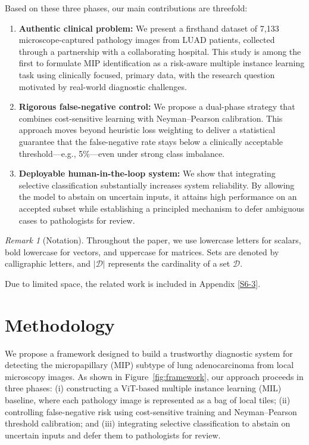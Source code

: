 \documentclass[sigconf,review,anonymous]{acmart}
\theoremstyle{remark}
\newtheorem{remark}[theorem]{Remark}
\begin{document}
Based on these three phases, our main contributions are threefold:
\begin{enumerate}
\item \textbf{Authentic clinical problem:} We present a firsthand dataset of 7,133 microscope-captured pathology images from LUAD patients, collected through a partnership with a collaborating hospital. This study is among the first to formulate MIP identification as a risk-aware multiple instance learning task using clinically focused, primary data, with the research question motivated by real-world diagnostic challenges.
\item \textbf{Rigorous false-negative control:} We propose a dual-phase strategy that combines cost-sensitive learning with Neyman–Pearson calibration. This approach moves beyond heuristic loss weighting to deliver a statistical guarantee that the false-negative rate stays below a clinically acceptable threshold—e.g., 5\%—even under strong class imbalance.
\item \textbf{Deployable human-in-the-loop system:} We show that integrating selective classification substantially increases system reliability. By allowing the model to abstain on uncertain inputs, it attains high performance on an accepted subset while establishing a principled mechanism to defer ambiguous cases to pathologists for review.
\end{enumerate}
\begin{remark}[Notation]
Throughout the paper, we use lowercase letters for scalars, bold lowercase for vectors, and uppercase for matrices. Sets are denoted by calligraphic letters, and $|\mathcal{D}|$ represents the cardinality of a set $\mathcal{D}$.
\end{remark}
Due to limited space, the related work is included in Appendix \ref{S6-3}.


\section{Methodology}\label{sec:methodology}

We propose a framework designed to build a trustworthy diagnostic system for detecting the micropapillary (MIP) subtype of lung adenocarcinoma from local microscopy images. As shown in Figure~\ref{fig:framework}, our approach proceeds in three phases: (i) constructing a ViT-based multiple instance learning (MIL) baseline, where each pathology image is represented as a bag of local tiles; (ii) controlling false-negative risk using cost-sensitive training and Neyman–Pearson threshold calibration; and (iii) integrating selective classification to abstain on uncertain inputs and defer them to pathologists for review.
\end{document}
